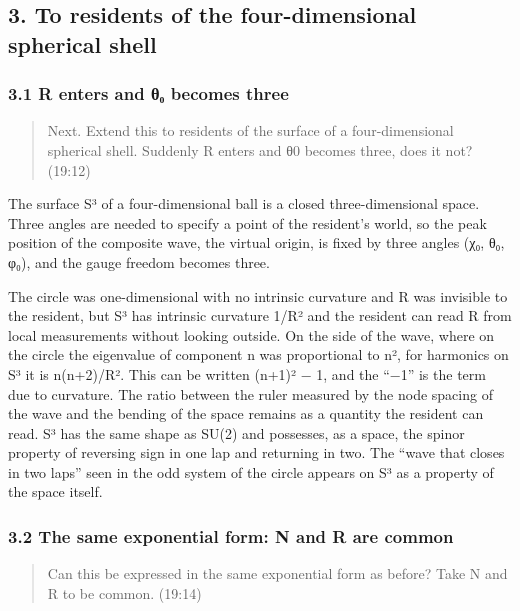 \documentclass[
  a4paper,
]{article}
\begin{document}
\subsection{3. To residents of the four-dimensional spherical
shell}\label{to-residents-of-the-four-dimensional-spherical-shell}

\subsubsection{3.1 R enters and θ₀ becomes
three}\label{r-enters-and-ux3b8ux2080-becomes-three}

\begin{quote}
Next. Extend this to residents of the surface of a four-dimensional
spherical shell. Suddenly R enters and θ0 becomes three, does it not?
(19:12)
\end{quote}

The surface S³ of a four-dimensional ball is a closed three-dimensional
space. Three angles are needed to specify a point of the resident's
world, so the peak position of the composite wave, the virtual origin,
is fixed by three angles (χ₀, θ₀, φ₀), and the gauge freedom becomes
three.

The circle was one-dimensional with no intrinsic curvature and R was
invisible to the resident, but S³ has intrinsic curvature 1/R² and the
resident can read R from local measurements without looking outside. On
the side of the wave, where on the circle the eigenvalue of component n
was proportional to n², for harmonics on S³ it is n(n+2)/R². This can be
written (n+1)² − 1, and the ``−1'' is the term due to curvature. The
ratio between the ruler measured by the node spacing of the wave and the
bending of the space remains as a quantity the resident can read. S³ has
the same shape as SU(2) and possesses, as a space, the spinor property
of reversing sign in one lap and returning in two. The ``wave that
closes in two laps'' seen in the odd system of the circle appears on S³
as a property of the space itself.

\subsubsection{3.2 The same exponential form: N and R are
common}\label{the-same-exponential-form-n-and-r-are-common}

\begin{quote}
Can this be expressed in the same exponential form as before? Take N and
R to be common. (19:14)
\end{quote}
\end{document}
